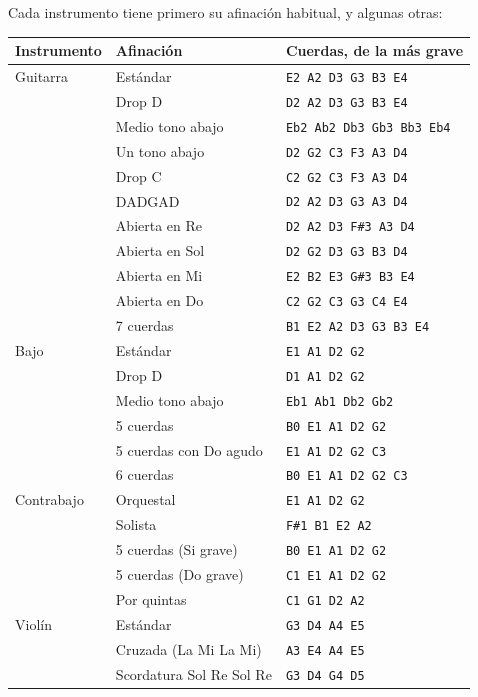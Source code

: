 \documentclass[12pt,
              article,
              oneside
              ]{memoir}
\begin{document}
%
Cada instrumento tiene primero su afinación habitual, y algunas otras:

\begin{longtable}{@{}lll@{}}
\toprule
Instrumento & Afinación & Cuerdas, de la más grave\\
\midrule
\endhead
Guitarra & Estándar & \texttt{E2 A2 D3 G3 B3 E4} \\
 & Drop D & \texttt{D2 A2 D3 G3 B3 E4} \\
 & Medio tono abajo & \texttt{Eb2 Ab2 Db3 Gb3 Bb3 Eb4} \\
 & Un tono abajo & \texttt{D2 G2 C3 F3 A3 D4} \\
 & Drop C & \texttt{C2 G2 C3 F3 A3 D4} \\
 & DADGAD & \texttt{D2 A2 D3 G3 A3 D4} \\
 & Abierta en Re & \texttt{D2 A2 D3 F\#3 A3 D4} \\
 & Abierta en Sol & \texttt{D2 G2 D3 G3 B3 D4} \\
 & Abierta en Mi & \texttt{E2 B2 E3 G\#3 B3 E4} \\
 & Abierta en Do & \texttt{C2 G2 C3 G3 C4 E4} \\
 & 7 cuerdas & \texttt{B1 E2 A2 D3 G3 B3 E4} \\
\addlinespace
Bajo & Estándar & \texttt{E1 A1 D2 G2} \\
 & Drop D & \texttt{D1 A1 D2 G2} \\
 & Medio tono abajo & \texttt{Eb1 Ab1 Db2 Gb2} \\
 & 5 cuerdas & \texttt{B0 E1 A1 D2 G2} \\
 & 5 cuerdas con Do agudo & \texttt{E1 A1 D2 G2 C3} \\
 & 6 cuerdas & \texttt{B0 E1 A1 D2 G2 C3} \\
\addlinespace
Contrabajo & Orquestal & \texttt{E1 A1 D2 G2} \\
 & Solista & \texttt{F\#1 B1 E2 A2} \\
 & 5 cuerdas (Si grave) & \texttt{B0 E1 A1 D2 G2} \\
 & 5 cuerdas (Do grave) & \texttt{C1 E1 A1 D2 G2} \\
 & Por quintas & \texttt{C1 G1 D2 A2} \\
\addlinespace
Violín & Estándar & \texttt{G3 D4 A4 E5} \\
 & Cruzada (La Mi La Mi) & \texttt{A3 E4 A4 E5} \\
 & Scordatura Sol Re Sol Re & \texttt{G3 D4 G4 D5} \\
\bottomrule
\end{longtable}
\end{document}

